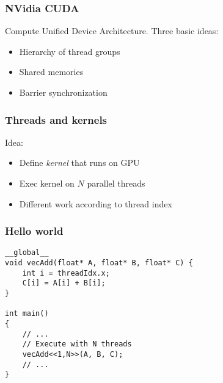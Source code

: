 \documentclass{beamer}
\begin{document}
\begin{frame}
  \frametitle{NVidia CUDA}

  Compute Unified Device Architecture.  Three basic ideas:
  \begin{itemize}
  \item Hierarchy of thread groups
  \item Shared memories
  \item Barrier synchronization
  \end{itemize}
  
\end{frame}


\begin{frame}
  \frametitle{Threads and kernels}

  Idea:
  \begin{itemize}
  \item Define {\em kernel} that runs on GPU
  \item Exec kernel on $N$ parallel threads
  \item Different work according to thread index
  \end{itemize}
\end{frame}


\begin{frame}[fragile]
  \frametitle{Hello world}

\begin{lstlisting}
__global__ 
void vecAdd(float* A, float* B, float* C) {
    int i = threadIdx.x;
    C[i] = A[i] + B[i];
}

int main()
{
    // ...
    // Execute with N threads
    vecAdd<<1,N>>(A, B, C);
    // ...
}
\end{lstlisting}
\end{frame}
\end{document}
